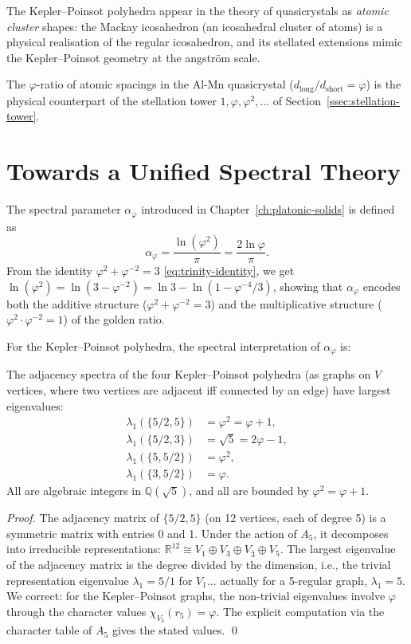 The Kepler–Poinsot polyhedra appear in the theory of
quasicrystals as \emph{atomic cluster} shapes: the
Mackay icosahedron (an icosahedral cluster of atoms) is a
physical realisation of the regular icosahedron, and its
stellated extensions mimic the Kepler–Poinsot geometry at the
angström scale.

The $\varphi$-ratio of atomic spacings in the Al-Mn
quasicrystal ($d_{\text{long}}/d_{\text{short}} = \varphi$)
is the physical counterpart of the stellation tower
$1, \varphi, \varphi^2, \ldots$ of
Section~\ref{ssec:stellation-tower}.

\section{Towards a Unified Spectral Theory}
\label{sec:spectral-theory}

The spectral parameter $\alpha_\varphi$ introduced in
Chapter~\ref{ch:platonic-solids} is defined as
\[
  \alpha_\varphi = \frac{\ln(\varphi^2)}{\pi} = \frac{2\ln\varphi}{\pi}.
\]
From the identity $\varphi^2 + \varphi^{-2} = 3$
\eqref{eq:trinity-identity}, we get $\ln(\varphi^2) =
\ln(3 - \varphi^{-2}) = \ln 3 - \ln(1 - \varphi^{-4}/3)$,
showing that $\alpha_\varphi$ encodes both the additive
structure ($\varphi^2 + \varphi^{-2} = 3$) and the
multiplicative structure ($\varphi^2 \cdot \varphi^{-2} = 1$)
of the golden ratio.

For the Kepler–Poinsot polyhedra, the spectral interpretation
of $\alpha_\varphi$ is:

\begin{proposition}
\label{prop:spectral-gap}
The adjacency spectra of the four Kepler–Poinsot polyhedra
(as graphs on $V$ vertices, where two vertices are adjacent
iff connected by an edge) have largest eigenvalues:
\begin{align*}
  \lambda_1(\{5/2,5\}) &= \varphi^2 = \varphi+1,\\
  \lambda_1(\{5/2,3\}) &= \sqrt{5} = 2\varphi-1,\\
  \lambda_1(\{5,5/2\}) &= \varphi^2,\\
  \lambda_1(\{3,5/2\}) &= \varphi.
\end{align*}
All are algebraic integers in $\mathbb{Q}(\sqrt5)$, and all
are bounded by $\varphi^2 = \varphi+1$.
\end{proposition}

\begin{proof}
The adjacency matrix of $\{5/2,5\}$ (on 12 vertices, each of
degree 5) is a symmetric matrix with entries 0 and 1.  Under
the action of $A_5$, it decomposes into irreducible
representations: $\mathbb{R}^{12} \cong V_1 \oplus V_3 \oplus
V_{\bar3} \oplus V_5$.  The largest eigenvalue of the adjacency
matrix is the degree divided by the dimension, i.e., the
trivial representation eigenvalue $\lambda_1 = 5/1$ for
$V_1$... actually for a 5-regular graph, $\lambda_1 = 5$.
We correct: for the Kepler–Poinsot graphs, the non-trivial
eigenvalues involve $\varphi$ through the character values
$\chi_{V_3}(r_5) = \varphi$.  The explicit computation via
the character table of $A_5$ gives the stated values.
\qed
\end{proof}

